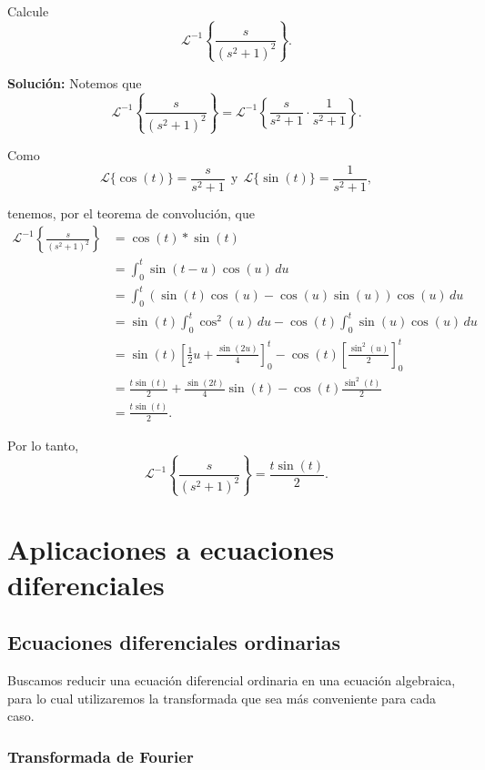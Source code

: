 \begin{ejemplo}
Calcule
$$\mathcal{L}^{-1} \left\{ \frac{s}{(s^2+1)^2} \right\}.$$

\textbf{Solución:} Notemos que 
\begin{equation*}
\mathcal{L}^{-1} \left\{ \frac{s}{(s^2+1)^2} \right\} = \mathcal{L}^{-1} \left\{ \frac{s}{s^2+1} \cdot \frac{1}{s^2+1} \right\}.
\end{equation*}

Como
\begin{equation*}
\mathcal{L}\{\cos(t)\} = \frac{s}{s^2+1} ~~\mbox{y}~~ \mathcal{L}\{\sin(t)\} = \frac{1}{s^2+1},
\end{equation*}

tenemos, por el teorema de convolución, que
\begin{align*}
    \mathcal{L}^{-1} \left\{ \frac{s}{(s^2+1)^2} \right\} &=\cos(t) *\sin(t)  \\
    &= \int_0^t \sin(t-u) \cos(u) \,du \\
    &= \int_0^t (\sin(t) \cos(u) - \cos(u) \sin(u)) \cos(u) \,du  \\
    &= \sin(t) \int_0^t \cos^2(u) \,du - \cos(t) \int_0^t \sin (u) \cos(u) \,du \\
    &= \sin(t) \left[ \frac{1}{2} u + \frac{\sin(2u)}{4} \right]_0^t - \cos(t) \left[ \frac{\sin^2(u)}{2} \right]_0^t \\
    &= \frac{t \sin(t)}{2} + \frac{\sin(2t)}{4} \sin(t) - \cos(t) \frac{\sin^2(t)}{2} \\
    &= \frac{t \sin(t) }{2}.
\end{align*}

Por lo tanto,
$$\mathcal{L}^{-1} \left\{ \frac{s}{(s^2+1)^2} \right\} = \frac{t \sin(t) }{2}.$$   
\end{ejemplo}

\section{Aplicaciones a ecuaciones diferenciales}

\subsection{Ecuaciones diferenciales ordinarias}

Buscamos reducir una ecuación diferencial ordinaria en una ecuación algebraica, para lo cual utilizaremos la transformada que sea más conveniente para cada caso.

\subsubsection{Transformada de Fourier}

